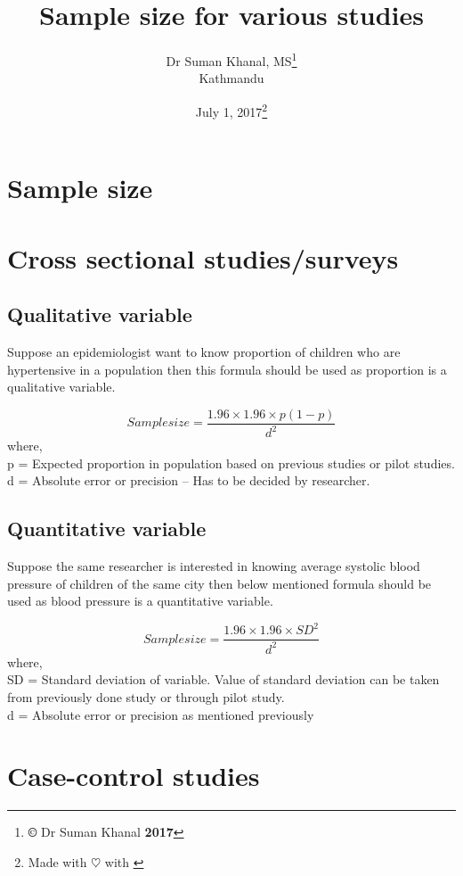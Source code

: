 \documentclass[12pt]{article}
\title{Sample size for various studies}
\author{Dr Suman Khanal, MS\footnote{\textbf{\copyright} Dr Suman Khanal \textbf{2017}}\\ Kathmandu}
\date{July 1, 2017\footnote{Made with $\heartsuit$ with \href{https://www.latex-project.org/}{\LaTeXe}}}
\begin{document}
\maketitle


\section*{Sample size}	

\section{Cross sectional studies/surveys}

\subsection{Qualitative variable}
	Suppose an epidemiologist want to know proportion of 
	children who are hypertensive in a population then this 
	formula should be used as proportion is a qualitative 
	variable.
	
\begin{equation}
Sample size =  \dfrac{1.96\times 1.96\times p(1-p)}{d^2}
\end{equation}
where,\\ 
p  =  Expected  proportion  in  population  based  on  
previous studies or pilot studies.\\
d  =  Absolute  error  or  precision  –  Has  to  be  decided  
by researcher.

\subsection{Quantitative variable}
Suppose the same researcher is interested in knowing 
average systolic blood pressure of children of the same 
city then below mentioned formula should be used as 
blood pressure is a quantitative variable.

\begin{equation}
Sample size=\dfrac{1.96\times 1.96\times {SD}^2}{d^2}
\end{equation}
where,\\
SD = Standard deviation of variable. Value of standard 
deviation can be taken from previously done study or 
through pilot study.\\
d  =  Absolute  error  or  precision  as  mentioned previously


\section{Case-control studies}
\end{document}
